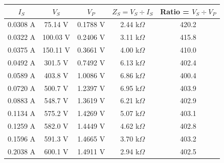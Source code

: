 \begin{center}
\begin{tabular}{| c | c | c | c | c |}
\hline 
$I_S$ & $V_S$ & $V_P$ & $Z_S = V_S \div I_S$ & Ratio = $V_S \div V_P$ \\[3pt] \hline
0.0308 A & 75.14 V & 0.1788 V & 2.44 k$\Omega$ & 420.2 \\[3pt] \hline 
0.0322 A & 100.03 V & 0.2406 V & 3.11 k$\Omega$ & 415.8 \\[3pt] \hline
0.0375 A & 150.11 V & 0.3661 V & 4.00 k$\Omega$ & 410.0 \\[3pt] \hline
0.0492 A & 301.5 V & 0.7492 V & 6.13 k$\Omega$ & 402.4 \\[3pt] \hline
0.0589 A & 403.8 V & 1.0086 V & 6.86 k$\Omega$ & 400.4 \\[3pt] \hline
0.0720 A & 500.7 V & 1.2397 V & 6.95 k$\Omega$ & 403.9 \\[3pt] \hline
0.0883 A & 548.7 V & 1.3619 V & 6.21 k$\Omega$ & 402.9 \\[3pt] \hline
0.1134 A & 575.2 V & 1.4269 V & 5.07 k$\Omega$ & 403.1 \\[3pt] \hline
0.1259 A & 582.0 V & 1.4449 V & 4.62 k$\Omega$ & 402.8 \\[3pt] \hline
0.1596 A & 591.3 V & 1.4665 V & 3.70 k$\Omega$ & 403.2 \\[3pt] \hline
0.2038 A & 600.1 V & 1.4911 V & 2.94 k$\Omega$ & 402.5 \\[3pt] \hline
\end{tabular}
\end{center}

